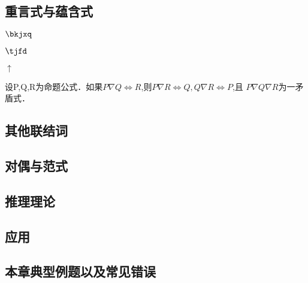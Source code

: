 \subsection{重言式与蕴含式}
\begin{definition}[不可兼析取]$\bkjxq$\end{definition} 
\begin{definition}[条件否定]$\tjfd$\end{definition} 
\begin{definition}[与非]$ \uparrow$\end{definition} 
\begin{theorem} 
设P,Q,R为命题公式．如果$P \nabla Q \Leftrightarrow R$,则$ P\nabla R \Leftrightarrow Q , Q \nabla R \Leftrightarrow P$,且 $P \nabla Q \nabla R
$为一矛盾式．
\end{theorem} 
\subsection{其他联结词}
\subsection{对偶与范式}
\subsection{推理理论}
\subsection{应用}
\subsection{本章典型例题以及常见错误}